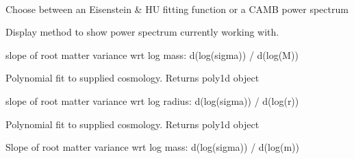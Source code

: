\documentclass[letterpaper,10pt,english]{sphinxmanual}
\begin{document}
\begin{fulllineitems}
\label{PyCosmo:PyCosmo.powspec.PowSpec}~

\begin{fulllineitems}
\label{PyCosmo:PyCosmo.powspec.PowSpec.choose}
Choose between an Eisenstein \& HU fitting function or a CAMB power spectrum

\end{fulllineitems}


\begin{fulllineitems}
\label{PyCosmo:PyCosmo.powspec.PowSpec.display}
Display method to show power spectrum currently working with.

\end{fulllineitems}


\begin{fulllineitems}
\label{PyCosmo:PyCosmo.powspec.PowSpec.dlnsigma_dlnm}
slope of root matter variance wrt log mass:
d(log(sigma)) / d(log(M))

Polynomial fit to supplied cosmology.
Returns poly1d object

\end{fulllineitems}


\begin{fulllineitems}
\label{PyCosmo:PyCosmo.powspec.PowSpec.dlnsigma_dlnr}
slope of root matter variance wrt log radius:
d(log(sigma)) / d(log(r))

Polynomial fit to supplied cosmology.
Returns poly1d object

\end{fulllineitems}


\begin{fulllineitems}
\label{PyCosmo:PyCosmo.powspec.PowSpec.dlnsigmadlnm_wmap7fit}
Slope of root matter variance wrt log mass:
d(log(sigma)) / d(log(m))


\end{fulllineitems}
\end{fulllineitems}
\end{document}
